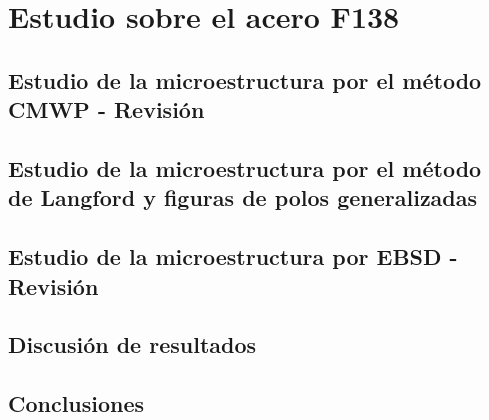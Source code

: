 \chapter{Estudio sobre el acero F138}
\graphicspath{{./figs/04_F138/}}
\section{Estudio de la microestructura por el método CMWP - Revisión}\label{S:F138CMWP}
\section{Estudio de la microestructura por el método de Langford y figuras de polos generalizadas}\label{S:F138LANG}
\section{Estudio de la microestructura por EBSD - Revisión}\label{S:F138EBSD}
\section{Discusión de resultados}\label{S:F138Dis}
\section{Conclusiones}\label{S:F138Conclusiones}
